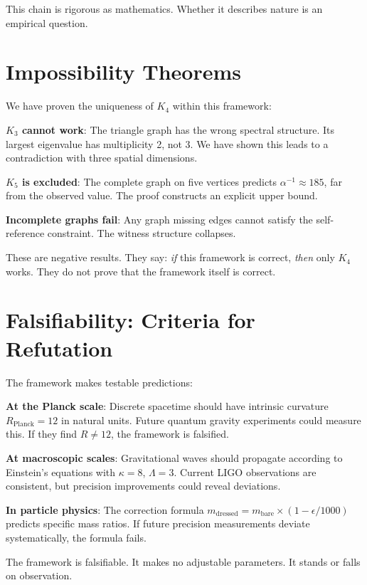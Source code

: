 \documentclass[11pt,a4paper]{book}
\begin{document}
This chain is rigorous as mathematics. Whether it describes nature is an empirical question.

\section{Impossibility Theorems}

We have proven the uniqueness of $K_4$ within this framework:

\textbf{$K_3$ cannot work}: The triangle graph has the wrong spectral structure. Its largest eigenvalue has multiplicity 2, not 3. We have shown this leads to a contradiction with three spatial dimensions.

\textbf{$K_5$ is excluded}: The complete graph on five vertices predicts $\alpha^{-1} \approx 185$, far from the observed value. The proof constructs an explicit upper bound.

\textbf{Incomplete graphs fail}: Any graph missing edges cannot satisfy the self-reference constraint. The witness structure collapses.

These are negative results. They say: \emph{if} this framework is correct, \emph{then} only $K_4$ works. They do not prove that the framework itself is correct.

\section{Falsifiability: Criteria for Refutation}

The framework makes testable predictions:

\textbf{At the Planck scale}: Discrete spacetime should have intrinsic curvature $R_{\text{Planck}} = 12$ in natural units. Future quantum gravity experiments could measure this. If they find $R \neq 12$, the framework is falsified.

\textbf{At macroscopic scales}: Gravitational waves should propagate according to Einstein's equations with $\kappa = 8$, $\Lambda = 3$. Current LIGO observations are consistent, but precision improvements could reveal deviations.

\textbf{In particle physics}: The correction formula $m_{\text{dressed}} = m_{\text{bare}} \times (1 - \epsilon/1000)$ predicts specific mass ratios. If future precision measurements deviate systematically, the formula fails.

The framework is falsifiable. It makes no adjustable parameters. It stands or falls on observation.
\end{document}
